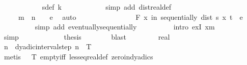\begin{isabellebody}
\ \ \ \ \ \ \ \ \ \ \isamarkupfalse%
\ s{\isacharunderscore}{\kern0pt}def\ k{\isacharparenleft}{\kern0pt}{}{\isacharparenright}{\kern0pt}\isanewline
\ \ \ \ \ \ \ \ \ \ \isamarkupfalse%
\ {\isacharparenleft}{\kern0pt}simp\ add{\isacharcolon}{\kern0pt}\ dist{\isacharunderscore}{\kern0pt}real{\isacharunderscore}{\kern0pt}def{\isacharparenright}{\kern0pt}\isanewline
\ \ \ \ \ \ \ \ \ \ \isamarkupfalse%
\ {\isacartoucheopen}{}\ {\isacharslash}{\kern0pt}\ {}\ {\isacharcircum}{\kern0pt}\ {\isacharparenleft}{\kern0pt}m{\isacharprime}{\kern0pt}\ {\isacharplus}{\kern0pt}\ n\ {\isacharplus}{\kern0pt}\ {}{\isacharparenright}{\kern0pt}\ {\isacharless}{\kern0pt}\ e{\isacartoucheclose}\ \isamarkupfalse%
\ auto\isanewline
\ \ \ \ \ \ \isacommand{{\isacharbraceright}{\kern0pt}}\isamarkupfalse%
\isanewline
\ \ \ \ \ \ \isamarkupfalse%
\ \isamarkupfalse%
\ {\isachardoublequoteopen}{\isasymforall}\isactrlsub F\ x\ in\ sequentially{\isachardot}{\kern0pt}\ dist\ {\isacharparenleft}{\kern0pt}s\ x{\isacharparenright}{\kern0pt}\ t\ {\isacharless}{\kern0pt}\ e{\isachardoublequoteclose}\isanewline
\ \ \ \ \ \ \ \ \isamarkupfalse%
\ {\isacharparenleft}{\kern0pt}simp\ add{\isacharcolon}{\kern0pt}\ eventually{\isacharunderscore}{\kern0pt}sequentially{\isacharparenright}{\kern0pt}\isanewline
\ \ \ \ \ \ \ \ \isamarkupfalse%
\ {\isacharparenleft}{\kern0pt}intro\ exI{\isacharbrackleft}{\kern0pt}\ x{\isacharequal}{\kern0pt}m{\isacharbrackright}{\kern0pt}{\isacharparenright}{\kern0pt}\isanewline
\ \ \ \ \ \ \ \ \isamarkupfalse%
\ simp\isanewline
\ \ \ \ \isamarkupfalse%
\isanewline
\ \ \ \ \isamarkupfalse%
\ \isamarkupfalse%
\ {\isacharquery}{\kern0pt}thesis\isanewline
\ \ \ \ \ \ \isamarkupfalse%
\ blast\isanewline
\ \ \isamarkupfalse%
\isanewline
\ \ \ \ \isamarkupfalse%
\ real\isanewline
\ \ \ \ \isamarkupfalse%
\ \isamarkupfalse%
\ n\ \ {\isachardoublequoteopen}dyadic{\isacharunderscore}{\kern0pt}interval{\isacharunderscore}{\kern0pt}step\ n\ {}\ T\ {\isasymnoteq}\ {\isacharbraceleft}{\kern0pt}{\isacharbraceright}{\kern0pt}{\isachardoublequoteclose}\isanewline
\ \ \ \ \ \ \isamarkupfalse%
\ {\isacharparenleft}{\kern0pt}metis\ {\isacartoucheopen}{}\ {\isacharless}{\kern0pt}\ T{\isacartoucheclose}\ empty{\isacharunderscore}{\kern0pt}iff\ less{\isacharunderscore}{\kern0pt}eq{\isacharunderscore}{\kern0pt}real{\isacharunderscore}{\kern0pt}def\ zero{\isacharunderscore}{\kern0pt}in{\isacharunderscore}{\kern0pt}dyadics{\isacharparenright}{\kern0pt}\isanewline

\end{isabellebody}
